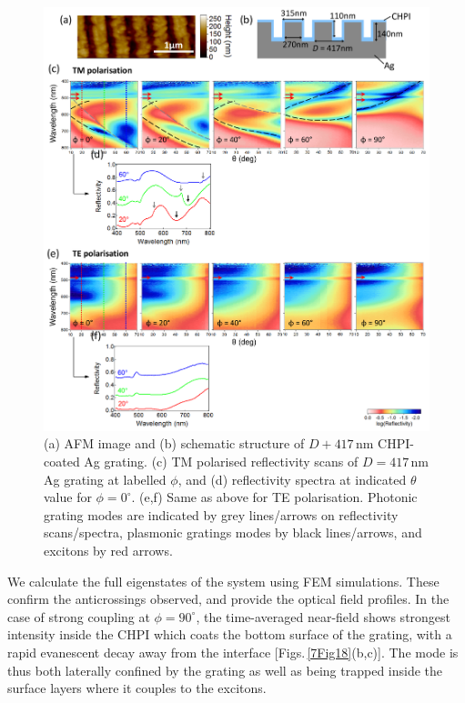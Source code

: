 \begin{figure}[h!] 
\centering    
\includegraphics[width=\textwidth]{Fig17}
\caption[(a) AFM image and (b) schematic structure of $D=417$\,nm CHPI-coated Ag grating. Reflectivity measurements of CHPI-coated Ag grating in (c,d) TM and (e.f) TE polarisation.]{(a) AFM image and (b) schematic structure of $D+417$\,nm CHPI-coated Ag grating. (c) TM polarised reflectivity scans of $D=417$\,nm Ag grating at labelled $\phi$, and (d) reflectivity spectra at indicated $\theta$ value for $\phi=0^{\circ}$. (e,f) Same as above for TE polarisation. Photonic grating modes are indicated by grey lines/arrows on reflectivity scans/spectra, plasmonic gratings modes by black lines/arrows, and excitons by red arrows.}
\label{7Fig17}
\end{figure}

We calculate the full eigenstates of the system using FEM simulations. These confirm the anticrossings observed, and provide the optical field profiles.
In the case of strong coupling at $\phi=90^{\circ}$, the time-averaged near-field shows strongest intensity inside the CHPI which coats the bottom surface of the grating, with a rapid evanescent decay away from the interface [Figs.\,\ref{7Fig18}(b,c)]. The mode is thus both laterally confined by the grating as well as being trapped inside the surface layers where it couples to the excitons.

